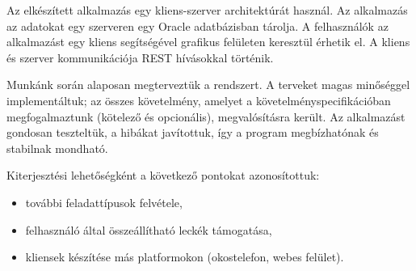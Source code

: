 \documentclass[11pt, a4paper]{article}
\begin{document}
	Az elkészített alkalmazás egy kliens-szerver architektúrát használ. Az alkalmazás az adatokat egy szerveren egy Oracle
	adatbázisban tárolja. A felhasználók az alkalmazást egy kliens segítségével grafikus felületen keresztül érhetik el. A kliens és szerver kommunikációja REST hívásokkal történik. 
	
	Munkánk során alaposan megterveztük a rendszert. A terveket magas minőséggel implementáltuk; az összes követelmény, amelyet a követelményspecifikációban megfogalmaztunk (kötelező és opcionális), megvalósításra került. Az alkalmazást gondosan teszteltük, a hibákat javítottuk, így a program megbízhatónak és stabilnak mondható.
	
	Kiterjesztési lehetőségként a következő pontokat azonosítottuk:
	\begin{itemize}
		\item további feladattípusok felvétele,
		\item felhasználó által összeállítható leckék támogatása,
		\item kliensek készítése más platformokon (okostelefon, webes felület).
	\end{itemize}
\end{document}
